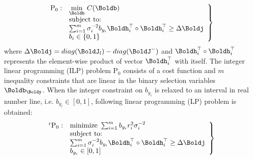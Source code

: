 %

\begin{align} \label{prob:RAPS_cost_constraints}
	\left.
	\begin{array}{rl}
		\text{P}_0: & \underset{\Boldb}{\text{min}} ~ C(\Boldb) \\ 
		& \text{subject to:} \\
		& \sum_{i=1}^m \sigma_i^{-2} b_{y_i} 
		\Boldh_i^\top \circ \Boldh_i^\top \ge \Delta \Boldj \\
		& b_i \in \{0,1\}
	\end{array}
	\right\}
\end{align}
where $\Delta \Boldj = diag(\BoldJ_l) - diag(\BoldJ^-)$ and $\Boldh_i^\top \circ \Boldh_i^\top$ represents the element-wise product of vector $\Boldh_i^\top$ with itself.
The integer linear programming (ILP) problem P$_0$ consists of a cost function and $m$ inequality constraints that are linear in the binary selection variables $\Boldb_{\Boldy}$. When the integer constraint on $b_{y_i}$ is relaxed to an interval in real number line, i.e. $b_{y_i} \in [0,1]$, following linear programming (LP) problem is obtained:	
\begin{align} \label{prob:RAPS_cost_constraints_relaxed2}
	\left.
	\begin{array}{rl}
		^\text{r}\text{P}_{0}: &
		\text{minimize} ~ \sum_{i=1}^m b_{y_i} r^2_i \sigma^{-2}_i \\ 
		& \text{subject to:} \\
		& \sum_{i=1}^m \sigma_i^{-2} b_{y_i} 
		\Boldh_i^\top \circ \Boldh_i^\top \ge \Delta \Boldj \\
		& b_{y_i} \in [0,1]
	\end{array}
	\right\}
\end{align}

